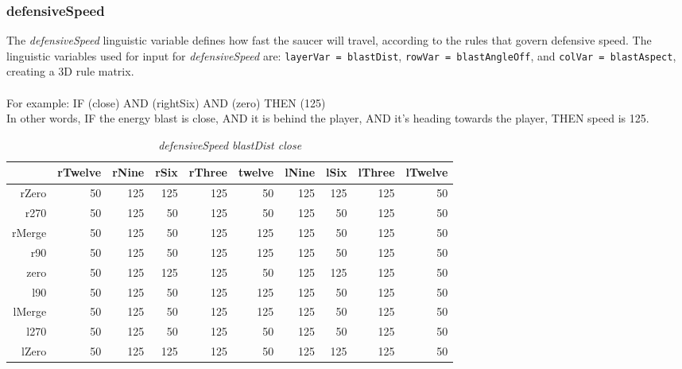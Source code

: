 \subsubsection{defensiveSpeed}

The \emph{defensiveSpeed} linguistic variable defines how fast the saucer will travel, according to the rules that govern defensive speed. The linguistic variables used for input for \emph{defensiveSpeed} are: \texttt{layerVar = blastDist}, \texttt{rowVar = blastAngleOff}, and \texttt{colVar = blastAspect}, creating a 3D rule matrix.
\\
\\
For example: IF (close) AND (rightSix) AND (zero) THEN (125) \\
In other words, IF the energy blast is close, AND it is behind the player, AND it's heading towards the player, THEN speed is 125.

\begin{table}[H]
\centering
\caption{\emph{defensiveSpeed} \emph{blastDist close}}
\begin{tabular}{r|r|r|r|r|r|r|r|r|r}
 		& rTwelve 	& rNine 	& rSix 		& rThree 		& twelve 	& lNine 	& lSix 		& lThree	& lTwelve		\\ \hline
rZero	& 50		& 125		& 125		& 125 		 	& 50		& 125		& 125 		& 125		& 50			\\
r270	& 50		& 125		& 50		& 125			& 50		& 125		& 50		& 125		& 50			\\
rMerge	& 50		& 125		& 50	 	& 125			& 125		& 125		& 50		& 125		& 50			\\
r90		& 50		& 125		& 50 		& 125			& 125		& 125		& 50		& 125		& 50			\\
zero 	& 50		& 125 		& 125 		& 125			& 50		& 125		& 125		& 125		& 50			\\
l90 	& 50		& 125 		& 50		& 125			& 125		& 125		& 50		& 125		& 50			\\
lMerge	& 50		& 125 		& 50	 	& 125			& 125		& 125		& 50		& 125		& 50			\\
l270 	& 50		& 125	 	& 50 		& 125			& 50		& 125		& 50		& 125		& 50			\\
lZero 	& 50		& 125 		& 125	 	& 125			& 50		& 125  		& 125		& 125		& 50			
\end{tabular}
\end{table}

